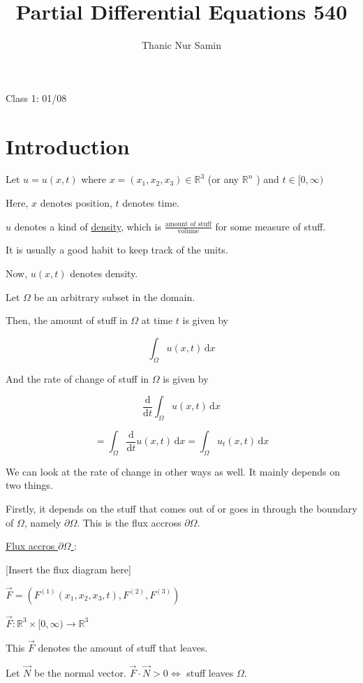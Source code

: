 \documentclass{article}
\title{Partial Differential Equations 540}
\author{Thanic Nur Samin}
\date{\vspace{-5ex}}
\theoremstyle{definition}
\begin{document}
\maketitle

Class 1: 01/08

\section*{Introduction}

Let \(u=u(x,t)\) where \(x=(x_1, x_2, x_3) \in \mathbb{R}^3\) (or any \(\mathbb{R} ^n\) ) and \(t\in [0,\infty)\) 

Here, \(x\) denotes position, \(t\) denotes time.

\(u\) denotes a kind of \underline{density}, which is \(\frac{\text{amount of stuff}}{\text{volume}}\) for some measure of stuff.

It is usually a good habit to keep track of the units.

Now, \(u(x,t)\) denotes density.

Let \(\Omega\) be an arbitrary subset in the domain.

Then, the amount of stuff in \(\Omega \) at time \(t\) is given by

\[
    \int _\Omega u(x,t) \, \mathrm{d} x
\]

And the rate of change of stuff in \(\Omega \) is given by

\[
    \frac{\mathrm{d}}{\mathrm{d}t} \int _\Omega u(x,t) \, \mathrm{d} x
\]

\[
    =\int_{\Omega }^{} \frac{\mathrm{d}}{\mathrm{d}t} u(x,t) \,\mathrm{d}x = \int_{\Omega }^{} u_t(x,t) \,\mathrm{d}x 
\]

We can look at the rate of change in other ways as well. It mainly depends on two things.

Firstly, it depends on the stuff that comes out of or goes in through the boundary of \(\Omega \), namely \(\partial \Omega \). This is the flux accross \(\partial \Omega \).

\underline{Flux accros \(\partial \Omega \) }:

[Insert the flux diagram here]

\(\vec{F} =(F^{(1)}(x_1, x_2, x_3, t),F^{(2)}, F^{(3)})\) 

\(\vec{F} :\mathbb{R} ^3 \times [0,\infty) \to \mathbb{R}^3\) 

This \(\vec{F} \) denotes the amount of stuff that leaves.

Let \(\vec{N} \) be the normal vector. \(\vec{F} \cdot \vec{N} >0 \iff \) stuff leaves \(\Omega \).
\end{document}

